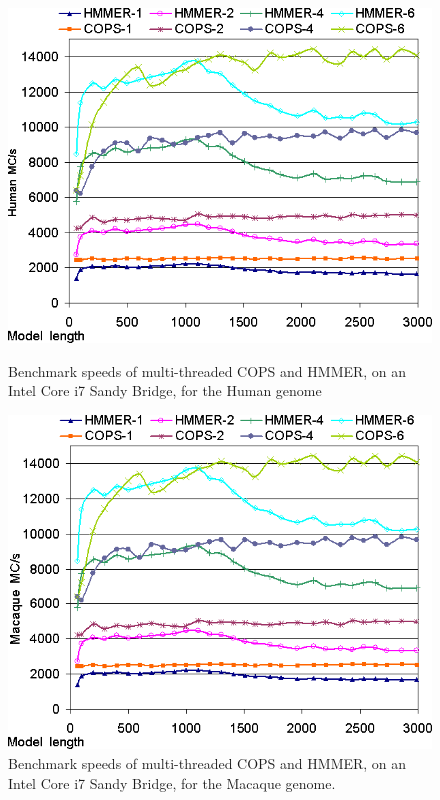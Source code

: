 \clearpage


\begin{figure}[h!]
    \begin{minipage}{0.48\linewidth}
		\centering
		\includegraphics[scale=0.46]{graphics/threads-larissa-runtimes-human.png}
		\caption[Speeds of the multi-threaded COPS and HMMER, Intel Core i7, Human] 
		{Benchmark speeds of multi-threaded COPS and HMMER, on an Intel Core i7 Sandy Bridge, for the Human genome}
		\label{threads-larissa-runtimes-human}
    \end{minipage}
    \hspace{0.04\linewidth}
    \begin{minipage}{0.48\linewidth}
		\centering
		\includegraphics[scale=0.46]{graphics/threads-larissa-runtimes-macaque.png}
		\caption[Speeds of the multi-threaded COPS and HMMER, Intel Core i7, Macaque] 
		{Benchmark speeds of multi-threaded COPS and HMMER, on an Intel Core i7 Sandy Bridge, for the Macaque genome.}
		\label{threads-larissa-runtimes-macaque}
    \end{minipage}
\end{figure} 

